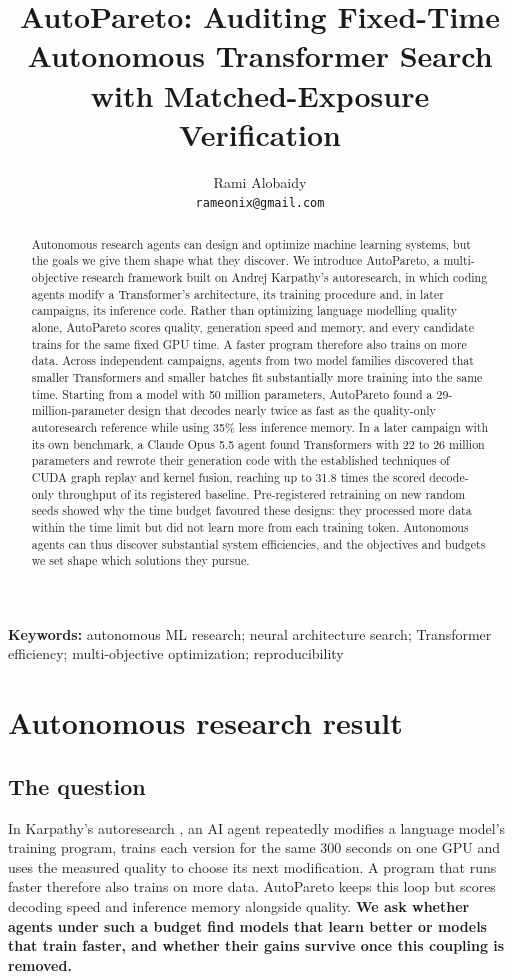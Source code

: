 \documentclass{article}
\title{AutoPareto: Auditing Fixed-Time Autonomous Transformer Search\\with Matched-Exposure Verification}
\author{Rami Alobaidy\\ \texttt{rameonix@gmail.com}}
\begin{document}
\maketitle
\begin{abstract}
Autonomous research agents can design and optimize machine learning systems, but the goals we give them shape what they discover. We introduce AutoPareto, a multi-objective research framework built on Andrej Karpathy's autoresearch, in which coding agents modify a Transformer's architecture, its training procedure and, in later campaigns, its inference code. Rather than optimizing language modelling quality alone, AutoPareto scores quality, generation speed and memory, and every candidate trains for the same fixed GPU time. A faster program therefore also trains on more data. Across independent campaigns, agents from two model families discovered that smaller Transformers and smaller batches fit substantially more training into the same time. Starting from a model with 50 million parameters, AutoPareto found a 29-million-parameter design that decodes nearly twice as fast as the quality-only autoresearch reference while using 35\% less inference memory. In a later campaign with its own benchmark, a Claude Opus 5.5 agent found Transformers with 22 to 26 million parameters and rewrote their generation code with the established techniques of CUDA graph replay and kernel fusion, reaching up to 31.8 times the scored decode-only throughput of its registered baseline. Pre-registered retraining on new random seeds showed why the time budget favoured these designs: they processed more data within the time limit but did not learn more from each training token. Autonomous agents can thus discover substantial system efficiencies, and the objectives and budgets we set shape which solutions they pursue.
\end{abstract}

\noindent\textbf{Keywords:} autonomous ML research; neural architecture search; Transformer efficiency; multi-objective optimization; reproducibility

\section{Autonomous research result}\label{partone}

\subsection{The question}\label{sec:question}
In Karpathy's autoresearch \citep{autoresearch}, an AI agent repeatedly modifies a language model's training program, trains each version for the same 300 seconds on one GPU and uses the measured quality to choose its next modification. A program that runs faster therefore also trains on more data. AutoPareto keeps this loop but scores decoding speed and inference memory alongside quality. \textbf{We ask whether agents under such a budget find models that learn better or models that train faster, and whether their gains survive once this coupling is removed.}
\end{document}
